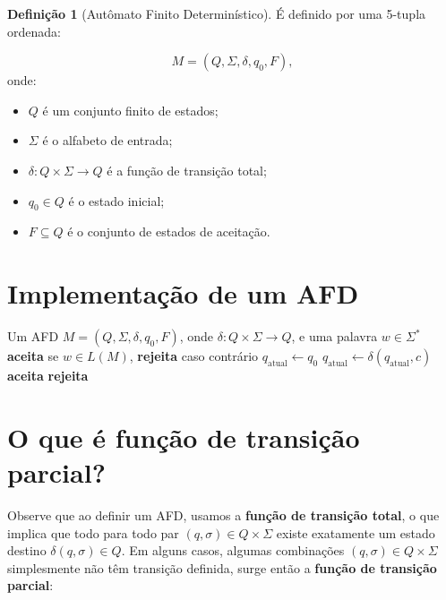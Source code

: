 \documentclass[12pt, a4paper]{article}
\theoremstyle{definition}
\newtheorem{definition}{Definição}[section]
\theoremstyle{plain}
\theoremstyle{remark}
\begin{document}
\begin{definition}[Autômato Finito Determinístico]
É definido por uma 5-tupla ordenada:

\[
M = (Q, \Sigma, \delta, q_0, F),
\]
onde:

\begin{itemize}
    \item $Q$ é um conjunto finito de estados;
    \item $\Sigma$ é o alfabeto de entrada;
    \item $\delta : Q \times \Sigma \to Q$ é a função de transição total;
    \item $q_0 \in Q$ é o estado inicial;
    \item $F \subseteq Q$ é o conjunto de estados de aceitação.
\end{itemize}

\end{definition}

\section{Implementação de um AFD}

\begin{algorithm}[H]
  \caption{Simulação de um AFD com $\delta(\cdot, \cdot)$ completa}
  \label{alg:afdCompleto}
  \begin{algorithmic}[1]
    \Require Um AFD $M = (Q, \Sigma, \delta, q_0, F)$,
             onde $\delta : Q \times \Sigma \to Q$,
             e uma palavra $w \in \Sigma^*$
    \Ensure  \textbf{aceita} se $w \in L(M)$, \textbf{rejeita} caso contrário
    \State $q_{\text{atual}} \gets q_0$
      \State $q_{\text{atual}} \gets \delta(q_{\text{atual}}, c)$
    \EndFor
      \State \Return \textbf{aceita}
    \Else
      \State \Return \textbf{rejeita}
    \EndIf
  \end{algorithmic}
\end{algorithm}

\section{O que é função de transição parcial?}

Observe que ao definir um AFD, usamos a \textbf{função de transição total}, o que implica que todo para todo par $(q, \sigma) \in Q \times \Sigma$ existe exatamente um estado destino $\delta(q, \sigma) \in Q$. Em alguns casos, algumas combinações $(q, \sigma) \in Q \times \Sigma$ simplesmente não têm transição definida, surge então a \textbf{função de transição parcial}:
\end{document}
